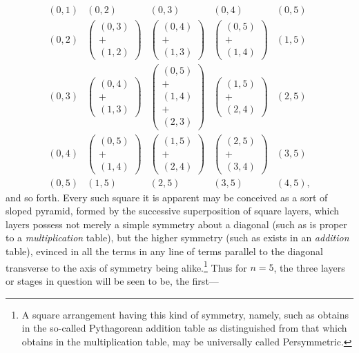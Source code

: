 \documentclass[11pt]{article}
\begin{document}
\[
\begin{array}{ccccc}
(0,1)&(0,2)&(0,3)&(0,4)&(0,5)\\
(0,2)&\left(\begin{array}{c}(0,3)\\+\\(1,2)\end{array}\right)&
\left(\begin{array}{c}(0,4)\\+\\(1,3)\end{array}\right)&
\left(\begin{array}{c}(0,5)\\+\\(1,4)\end{array}\right)&(1,5)\\
(0,3)&\left(\begin{array}{c}(0,4)\\+\\(1,3)\end{array}\right)&
\left(\begin{array}{c}(0,5)\\+\\(1,4)\\+\\(2,3)\end{array}\right)&
\left(\begin{array}{c}(1,5)\\+\\(2,4)\end{array}\right)&(2,5)\\
(0,4)&\left(\begin{array}{c}(0,5)\\+\\(1,4)\end{array}\right)&
\left(\begin{array}{c}(1,5)\\+\\(2,4)\end{array}\right)&
\left(\begin{array}{c}(2,5)\\+\\(3,4)\end{array}\right)&(3,5)\\
(0,5)&(1,5)&(2,5)&(3,5)&(4,5),
\end{array}
\]
and so forth. Every such square it is apparent may be conceived as a sort of sloped pyramid, formed by the successive superposition of square layers, which layers possess not merely a simple symmetry about a diagonal (such as is proper to a \emph{multiplication} table), but the higher symmetry (such as exists in an \emph{addition} table), evinced in all the terms in any line of terms parallel to the diagonal transverse to the axis of symmetry being alike.\footnote{A square arrangement having this kind of symmetry, namely, such as obtains in the so-called Pythagorean addition table as distinguished from that which obtains in the multiplication table, may be universally called Persymmetric.} Thus for $n=5$, the three layers or stages in question will be seen to be, the first---
\end{document}
